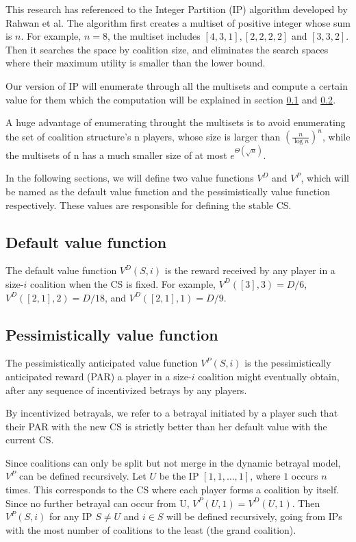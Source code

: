 \documentclass[sigconf,anonymous]{aamas}
\begin{document}
This research has referenced to the Integer Partition (IP) algorithm developed by Rahwan et al. The algorithm first creates a multiset of positive integer whose sum is $n$. For example, $n=8$, the multiset includes $[4, 3, 1], [2, 2, 2, 2]$ and $[3, 3, 2]$. Then it searches the space by coalition size, and eliminates the search spaces where their maximum utility is smaller than the lower bound. 

Our version of IP will enumerate through all the multisets and compute a certain value for them which the computation will be explained in section \ref{sec:dv-func} and \ref{sec:pv-func}. 

A huge advantage of enumerating throught the multisets is to avoid enumerating the set of coalition structure's n players, whose size is larger than $(\frac{n}{\log n })^n$, while the multisets of n has a much smaller size of at most $e^{\Theta(\sqrt{n})}$. 

In the following sections, we will define two value functions $V^D$ and $V^P$, which will be named as the default value function and the pessimistically value function respectively. These values are responsible for defining the stable CS. 

\subsection{Default value function}
\label{sec:dv-func}

The default value function $V^D(S, i)$ is the reward received by any player in a size-$i$ coalition when the CS is fixed. 
For example, $V^D([3], 3) = D/6$, $V^D([2, 1], 2) = D/18$, and $V^D([2, 1], 1) = D/9$. 

\subsection{Pessimistically value function}
\label{sec:pv-func}

The pessimistically anticipated value function $V^P(S, i)$ is the pessimistically anticipated reward (PAR) a player in a size-$i$ coalition might eventually obtain, after any sequence of incentivized betrays by any players.

By incentivized betrayals, we refer to a betrayal initiated by a player such that their PAR with the new CS is strictly better than her default value with the current CS. 

Since coalitions can only be split but not merge in the dynamic betrayal model, $V^P$ can be defined recursively. Let $U$ be the IP $[1, 1, \dots, 1]$, where $1$ occurs $n$ times. This corresponds to the CS where each player forms a coalition by itself. Since no further betrayal can occur from U, $V^P(U, 1)=V^D(U, 1)$. Then $V^P(S, i)$ for any IP $S \neq U$ and $i \in S$ will be defined recursively, going from IPs with the most number of coalitions to the least (the grand coalition).
\end{document}
